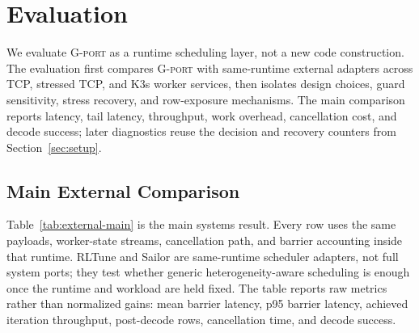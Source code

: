 \section{Evaluation}
\label{sec:evaluation}

We evaluate \textsc{G-port} as a runtime scheduling layer, not a new code
construction.  The evaluation first compares \textsc{G-port} with same-runtime
external adapters across TCP, stressed TCP, and K3s worker services, then
isolates design choices, guard sensitivity, stress recovery, and row-exposure
mechanisms.  The main comparison reports latency, tail latency, throughput, work
overhead, cancellation cost, and decode success; later diagnostics reuse the
decision and recovery counters from Section~\ref{sec:setup}.

\subsection{Main External Comparison}

Table~\ref{tab:external-main} is the main systems result.  Every row uses the
same payloads, worker-state streams, cancellation path, and barrier accounting
inside that runtime.  RLTune and Sailor are same-runtime scheduler adapters, not
full system ports; they test whether generic heterogeneity-aware scheduling is
enough once the runtime and workload are held fixed.  The table reports raw
metrics rather than normalized gains: mean barrier latency, p95 barrier latency,
achieved iteration throughput, post-decode rows, cancellation time, and decode
success.

